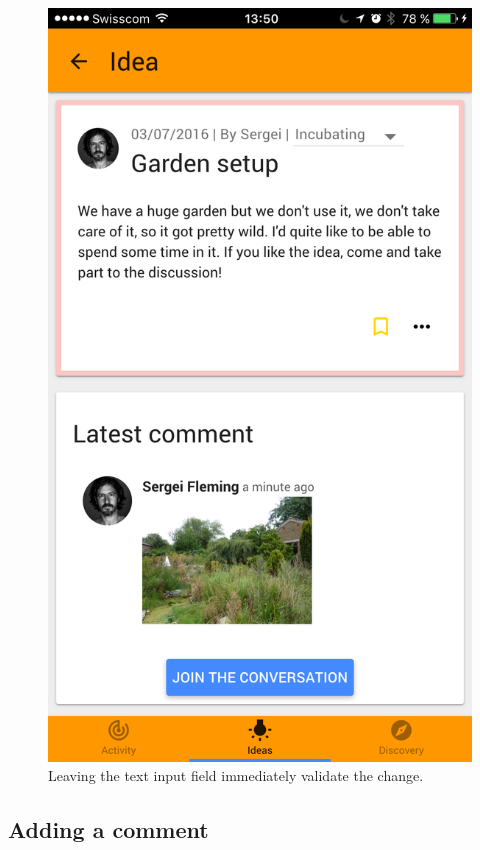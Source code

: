 \documentclass[a4paper,12pt,twoside]{article}
\begin{document}
\begin{figure}[!htb]
\begin{minipage}[t]{.32\textwidth}
        \includegraphics[width=\textwidth]{images/flow_updateIdeaName_3.png}
        \caption{Leaving the text input field immediately validate the change.}
    \end{minipage}
\end{figure}

\clearpage
\subsection{Adding a comment}
\label{sec.addingComment}
\end{document}
